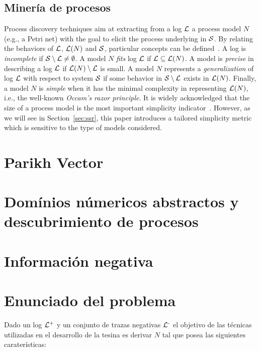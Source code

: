 \subsection{Minería de procesos} 
\label{sec:2.process mining subsection}

Process discovery techniques aim
at extracting from a log ${\mathcal L}$ a process model $N$ (e.g., a Petri net) with the goal to elicit the process
underlying in ${\mathcal{S}}$. By relating the behaviors of ${\mathcal L}$, $\mathcal{L}(N)$ and ${\mathcal{S}}$,
particular concepts can be defined~\cite{BuijsDA14}. A log is \emph{incomplete} if ${\mathcal{S}} \setminus {\mathcal L} \ne
\emptyset$. A model $N$ \emph{fits} log ${\mathcal L}$ if ${\mathcal L} \subseteq \mathcal{L}(N)$. A model is
\emph{precise} in describing a log ${\mathcal L}$ if $\mathcal{L}(N) \setminus {\mathcal L}$ is small. A model $N$
represents a \emph{generalization} of log ${\mathcal L}$ with respect to system ${\mathcal{S}}$ if some behavior in ${\mathcal{S}}
\setminus {\mathcal L}$ exists in $\mathcal{L}(N)$. Finally, a model $N$ is \emph{simple} when it has the minimal
complexity in representing $\mathcal{L}(N)$, i.e., the well-known \emph{Occam's razor principle}.
It is widely acknowledged that the size of a process model is the
most important simplicity indicator~\cite{AalstBook}. However, as we will see in Section~\ref{sec:ssr}, this paper introduces
a tailored simplicity metric which is sensitive to the type of models considered.

\section{Parikh Vector} 
\label{sec:2.parikh}

\section{Domínios númericos abstractos y descubrimiento de procesos} 
\label{sec:2.discovery}

\section{Información negativa} 
\label{sec:2.negative}

\section{Enunciado del problema} 
\label{sec:2.problem}

Dado un log ${\mathcal L}\textsuperscript{+}$ y un conjunto de trazas negativas ${\mathcal L}\textsuperscript{-}$ el objetivo de las técnicas utilizadas 
en el desarrollo de la tesina es derivar $N$ tal que posea las siguientes caraterísticas:\\

